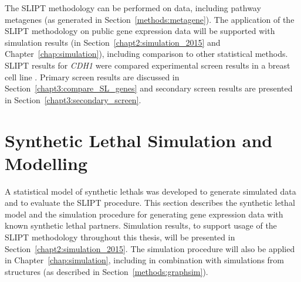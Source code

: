 The \gls{SLIPT} methodology can be performed on  data, including pathway \glspl{metagene} (as generated in Section~\ref{methods:metagene}). The application of the \gls{SLIPT} methodology on public \gls{gene expression} data will be supported with simulation results (in Section~\ref{chapt2:simulation_2015} and Chapter~\ref{chap:simulation}), including comparison to other statistical methods. \gls{SLIPT} results for \textit{CDH1} were compared experimental screen results in a breast cell line \citep{Telford2015}. Primary screen results are discussed in Section~\ref{chapt3:compare_SL_genes} and secondary screen results are presented in Section~\ref{chapt3:secondary_screen}.



\FloatBarrier

\section{Synthetic Lethal Simulation and Modelling} \label{methods:simulation_SL_expression} 

A statistical model of \glspl{synthetic lethal} was developed to generate simulated data and to evaluate the \gls{SLIPT} procedure. This section describes the \gls{synthetic lethal} model and the simulation procedure for generating \gls{gene expression} data with known \gls{synthetic lethal} partners. Simulation results, to support usage of the \gls{SLIPT} methodology throughout this thesis, will be presented in Section~\ref{chapt2:simulation_2015}. The simulation procedure will also be applied in Chapter~\ref{chap:simulation}, including in combination with simulations from  structures (as described in Section~\ref{methods:graphsim}).

